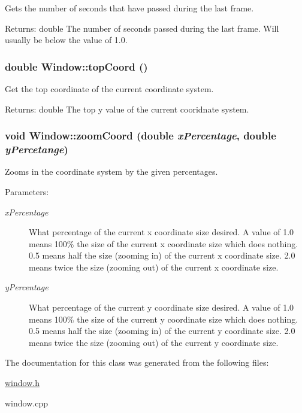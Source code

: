 Gets the number of seconds that have passed during the last frame. 

\begin{Desc}
\item[Returns:]double The number of seconds passed during the last frame. Will usually be below the value of 1.0. \end{Desc}
\hypertarget{class_window_03ada979fd7c6e076e41c82092931dbc}{
\subsubsection[{topCoord}]{\setlength{\rightskip}{0pt plus 5cm}double Window::topCoord ()}}
\label{class_window_03ada979fd7c6e076e41c82092931dbc}


Get the top coordinate of the current coordinate system. 

\begin{Desc}
\item[Returns:]double The top y value of the current cooridnate system. \end{Desc}
\hypertarget{class_window_17bf4f56e07ed30749573b72e81353d9}{
\subsubsection[{zoomCoord}]{\setlength{\rightskip}{0pt plus 5cm}void Window::zoomCoord (double {\em xPercentage}, \/  double {\em yPercetange})}}
\label{class_window_17bf4f56e07ed30749573b72e81353d9}


Zooms in the coordinate system by the given percentages. 

\begin{Desc}
\item[Parameters:]
\begin{description}
\item[{\em xPercentage}]What percentage of the current x coordinate size desired. A value of 1.0 means 100\% the size of the current x coordinate size which does nothing. 0.5 means half the size (zooming in) of the current x coordinate size. 2.0 means twice the size (zooming out) of the current x coordinate size. \item[{\em yPercentage}]What percentage of the current y coordinate size desired. A value of 1.0 means 100\% the size of the current y coordinate size which does nothing. 0.5 means half the size (zooming in) of the current y coordinate size. 2.0 means twice the size (zooming out) of the current y coordinate size. \end{description}
\end{Desc}


The documentation for this class was generated from the following files:\begin{CompactItemize}
\item 
\hyperlink{window_8h}{window.h}\item 
window.cpp\end{CompactItemize}
